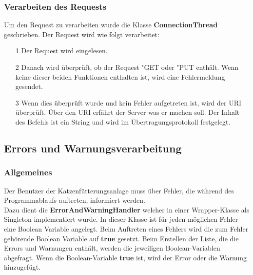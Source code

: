 \subsubsection{Verarbeiten des Requests}
Um den Request zu verarbeiten wurde die Klasse \textbf{ConnectionThread} geschrieben. Der Request wird wie folgt verarbeitet:
\begin{itemize}
\item[1] Der Request wird eingelesen.
\item[2] Danach wird überprüft, ob der Request "GET\grqq{} oder "PUT\grqq{} enthält. Wenn keine dieser beiden Funktionen enthalten ist, wird eine Fehlermeldung gesendet.
\item[3] Wenn dies überprüft wurde und kein Fehler aufgetreten ist, wird der \ac{URI} überprüft. Über den \ac{URI} erfährt der Server was er machen soll. Der Inhalt des Befehls ist ein String und wird im Übertragungsprotokoll festgelegt.
\end{itemize}

\subsection{Errors und Warnungsverarbeitung}
\subsubsection{Allgemeines}
Der Benutzer der Katzenfütterungsanlage muss über Fehler, die während des Programmablaufs auftreten, informiert werden. 
\\ Dazu dient die \textbf{ErrorAndWarningHandler} welcher in einer Wrapper-Klasse als Singleton implementiert wurde. In dieser Klasse ist für jeden möglichen Fehler eine Boolean Variable angelegt. Beim Auftreten eines Fehlers wird die zum Fehler gehörende Boolean Variable auf \textbf{true} gesetzt. Beim Erstellen der Liste, die die Errors und Warnungen enthält, werden die jeweiligen Boolean-Variablen abgefragt. Wenn die Boolean-Variable \textbf{true} ist, wird der Error oder die Warnung hinzugefügt. 

